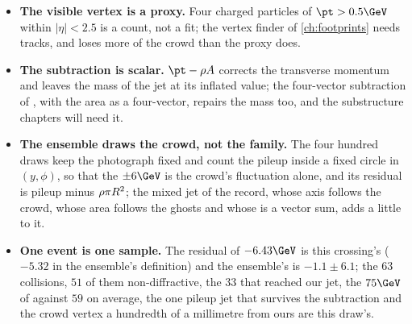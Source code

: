 \begin{itemize}
    rather than widths computed from the bunches; the fills of 2025, with
    their own $\beta^*$ and crossing angle, had their own beam spot, and
    the real one is measured run by run.
  \item \textbf{The visible vertex is a proxy.} Four charged particles of
    $\pt>0.5\GeV$ within $|\eta|<2.5$ is a count, not a fit; the vertex
    finder of \cref{ch:footprints} needs tracks, and loses more of
    the crowd than the proxy does.
  \item \textbf{The subtraction is scalar.} $\pt-\rhoPU A$ corrects the
    transverse momentum and leaves the mass of the jet at its inflated
    value; the four-vector subtraction of \cite{Cacciari:2008gn}, with the
    area as a four-vector, repairs the mass too, and the substructure
    chapters will need it.
  \item \textbf{The ensemble draws the crowd, not the family.} The four
    hundred draws keep the photograph fixed and count the pileup inside a
    fixed circle in $(y,\phi)$, so that the $\pm6\GeV$ is the crowd's
    fluctuation alone, and its residual is pileup minus $\rho\pi R^2$;
    the mixed jet of the record, whose axis follows the crowd, whose area
    follows the ghosts and whose \pt is a vector sum, adds a little to it.
  \item \textbf{One event is one sample.} The residual of $-6.43\GeV$ is
    this crossing's ($-5.32$ in the ensemble's definition) and the
    ensemble's is $-1.1\pm6.1$; the $63$
    collisions, $51$ of them non-diffractive, the $33$ that reached our
    jet, the $75\GeV$ of \rhoPU against $59$ on average, the one pileup
    jet that survives the subtraction and the crowd vertex a hundredth
    of a millimetre from ours are this draw's.
\end{itemize}

